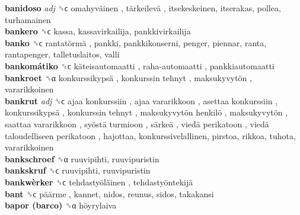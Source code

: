 \textbf{banidoso} \emph{adj}  ␝ϲ   omahyväinen ,  tärkeilevä , itsekeskeinen, itserakas, pollea, turhamainen  \\
\textbf{bankero} ␝ϲ  kassa, kassavirkailija, pankkivirkailija  \\
\textbf{banko} ␝ϲ   rantatörmä , pankki, pankkikonserni, penger, piennar, ranta, rantapenger, talletuslaitos, valli  \\
\textbf{bankomátiko} ␝ϲ   käteisautomaatti ,  raha-automaatti , pankkiautomaatti  \\
\textbf{bankroet} ␝α   konkurssikypsä ,  konkurssin tehnyt ,  maksukyvytön , vararikkoinen  \\
\textbf{bankrut} \emph{adj}  ␝ϲ   ajaa konkurssiin ,  ajaa vararikkoon ,  asettaa konkurssiin ,  konkurssikypsä ,  konkurssin tehnyt ,  maksukyvytön henkilö ,  maksukyvytön ,  saattaa vararikkoon ,  syöstä turmioon ,  särkeä ,  viedä perikatoon ,  viedä taloudelliseen perikatoon , hajottaa, konkurssivelallinen, pirstoa, rikkoa, tuhota, vararikkoinen  \\
\textbf{bankschroef} ␝α  ruuvipihti, ruuvipuristin  \\
\textbf{bankskruf} ␝ϲ  ruuvipihti, ruuvipuristin  \\
\textbf{bankwèrker} ␝ϲ   tehdastyöläinen ,  tehdastyöntekijä   \\
\textbf{bant} ␝ϲ   päärme , kannet, nidos, reunus, sidos, takakansi  \\
\textbf{bapor (barco)} ␝α   höyrylaiva   \\
